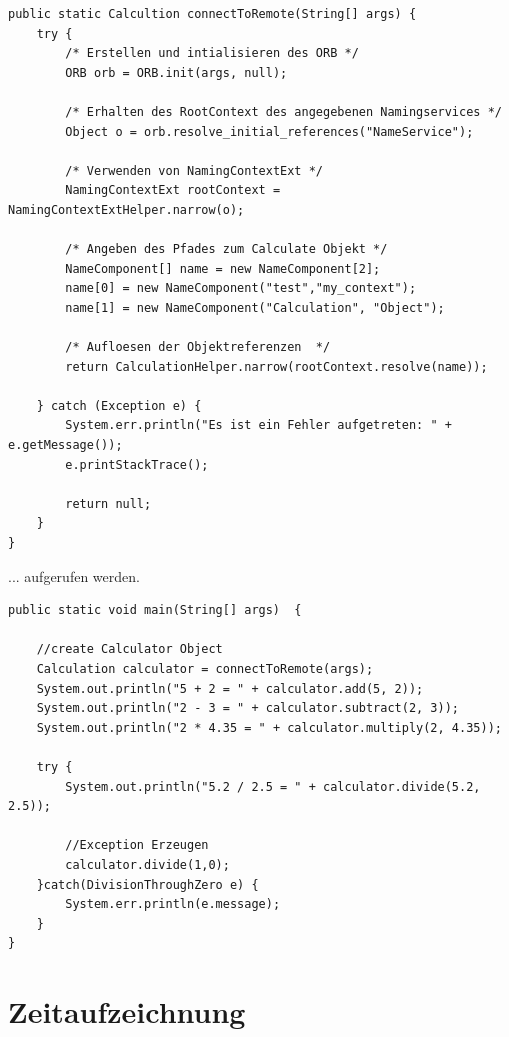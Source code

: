 \begin{lstlisting}[style=java, caption=Client.java JacORB Verbindung]
public static Calcultion connectToRemote(String[] args) {
	try {
		/* Erstellen und intialisieren des ORB */
		ORB orb = ORB.init(args, null);

		/* Erhalten des RootContext des angegebenen Namingservices */
		Object o = orb.resolve_initial_references("NameService");

		/* Verwenden von NamingContextExt */
		NamingContextExt rootContext = NamingContextExtHelper.narrow(o);

		/* Angeben des Pfades zum Calculate Objekt */
		NameComponent[] name = new NameComponent[2];
		name[0] = new NameComponent("test","my_context");
		name[1] = new NameComponent("Calculation", "Object");

		/* Aufloesen der Objektreferenzen  */
		return CalculationHelper.narrow(rootContext.resolve(name));

	} catch (Exception e) {
		System.err.println("Es ist ein Fehler aufgetreten: " + e.getMessage());
		e.printStackTrace();

		return null;
	}
}

\end{lstlisting}

... aufgerufen werden.

\begin{lstlisting}[style=java, caption=Client.java JacORB Verbindung]
public static void main(String[] args)  {

	//create Calculator Object
	Calculation calculator = connectToRemote(args);
	System.out.println("5 + 2 = " + calculator.add(5, 2));
	System.out.println("2 - 3 = " + calculator.subtract(2, 3));
	System.out.println("2 * 4.35 = " + calculator.multiply(2, 4.35));

	try {
		System.out.println("5.2 / 2.5 = " + calculator.divide(5.2, 2.5));

		//Exception Erzeugen
		calculator.divide(1,0);
	}catch(DivisionThroughZero e) {
		System.err.println(e.message);
	}
}
\end{lstlisting}

\clearpage

\section{Zeitaufzeichnung}

